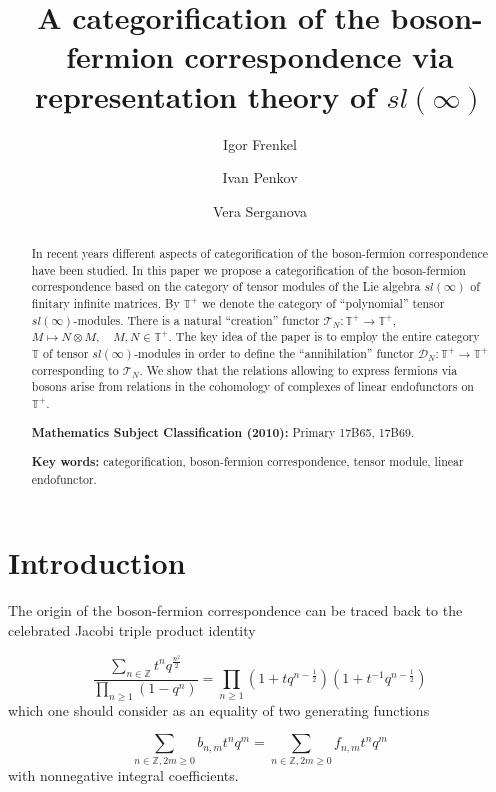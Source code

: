 \documentclass[11pt]{amsart}
\title{A categorification of the boson-fermion correspondence via representation theory of $sl(\infty)$}
\author[Igor Frenkel]{\;Igor Frenkel}
\author[Ivan Penkov]{\;Ivan Penkov}
\author[Vera Serganova]{\;Vera Serganova}
\newcommand {\ZZ} {\mathbb {Z}}
\begin{document}
\maketitle
\begin{abstract} In recent years different aspects of categorification of the boson-fermion correspondence
have been studied. In this paper we propose a categorification of the boson-fermion correspondence based on
the category of tensor modules of the Lie algebra $sl(\infty)$ of finitary infinite matrices. By $\mathbb T^+$ we denote
the category of ``polynomial'' tensor  $sl(\infty)$-modules. There is a natural ``creation'' functor $\mathcal T_N: \mathbb T^+\to \mathbb T^+$,
$M\mapsto N\otimes M,\quad M,N\in \mathbb T^+$. The key idea of the paper is to employ the entire category $\mathbb T$ of tensor $sl(\infty)$-modules
in order to define the ``annihilation'' functor $\mathcal D_N: \mathbb T^+\to \mathbb T^+$ corresponding to $\mathcal T_N$.
We show that the relations allowing to express fermions via bosons arise from relations in the cohomology of complexes of linear endofunctors on $\mathbb T^+$. 

\textbf{Mathematics Subject Classification (2010):} Primary 17B65, 17B69. 
 
\textbf{Key words:} categorification, boson-fermion correspondence, tensor module, linear endofunctor.
\end{abstract}
\section {Introduction}

The origin of the boson-fermion correspondence can be traced back to the celebrated 
Jacobi triple product identity

\begin{equation}\label{Jacobi}
  \frac{\sum_{n \in \ZZ}t^nq^\frac{n^2}{2}}{\prod_{n \geq 1}(1-q^n)} = \prod_{n \geq 1} (1+tq^{n-\frac{1}{2}})(1+t^{-1}q^{n-\frac{1}{2}})
\end{equation}
which one should consider as an equality of two generating functions

\begin{equation}\label{Jacgenf}
 \sum_{n \in \ZZ, 2m \geq 0} b_{n,m} t^nq^m = \sum_{n \in \ZZ, 2m \geq 0} f_{n,m} t^nq^m\nonumber
\end{equation}
with nonnegative integral coefficients.
\end{document}
